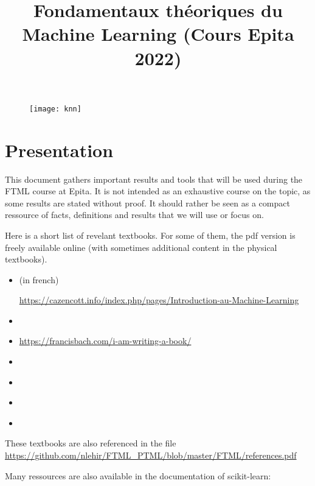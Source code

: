 \documentclass[
10pt, %
a4paper, %
oneside, %
headinclude,footinclude, %
BCOR5mm, %
]{scrartcl}
\title{{Fondamentaux théoriques du Machine Learning (Cours Epita 2022)}}
\author{\spacedlowsmallcaps{Nicolas Le Hir}}
\date{}
\begin{document}
\renewcommand{\sectionmark}[1]{\markright{\spacedlowsmallcaps{#1}}}
\lehead{\mbox{\llap{\small\thepage\kern1em\color{halfgray} \vline}\color{halfgray}\hspace{0.5em}\rightmark\hfil}} 
\pagestyle{scrheadings}
\maketitle 
\setcounter{tocdepth}{3} 

\begin{figure}[htpb]
    \centering
    \texttt{[image: knn]}
    \label{fig:knn}
\end{figure}

\tableofcontents

\section*{\large\color{Blue}Presentation}

This document gathers important results and tools that will be used during the FTML course at Epita. It is not intended as an exhaustive course on the topic, as some results are stated without proof. It should rather be seen as a compact ressource of facts, definitions and results that we will use or focus on.

Here is a short list of revelant textbooks. For some of them, the pdf version is freely available online (with sometimes additional content in the physical textbooks).
\begin{itemize}
    \item \cite{Azencott2022}  (in french)

\url{https://cazencott.info/index.php/pages/Introduction-au-Machine-Learning} 
\item \cite{Alpaydin} 
\item \cite{Bach2021} 

\url{https://francisbach.com/i-am-writing-a-book/} 
\item \cite{Shalev-Shwartz2013} 
\item \cite{Cornuejols2003} 
\item \cite{Allaire2012} 
\item \cite{Hastie2009} 
\end{itemize}

These textbooks are also referenced in the file
\url{https://github.com/nlehir/FTML_PTML/blob/master/FTML/references.pdf} 

Many ressources are also available in the documentation of scikit-learn:
\end{document}
